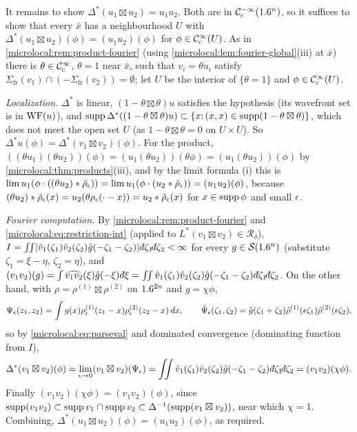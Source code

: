 It remains to show $\Delta^*(u_1\boxtimes u_2)=u_1u_2$. Both are in $\mathcal{C}^{-\infty}_{\mathrm{c}}(1.6^n)$, so it suffices to show
that every $\bar x$ has a neighbourhood $U$ with $\Delta^*(u_1\boxtimes u_2)(\phi)=(u_1u_2)(\phi)$ for
$\phi\in\mathcal{C}^\infty_{\mathrm{c}}(U)$. As in \cref{microlocal:rem:product-fourier} (using
\cref{microlocal:lem:fourier-global}(iii) at $\bar x$) there is $\theta\in\mathcal{C}^\infty_{\mathrm{c}}$, $\theta=1$ near $\bar x$,
such that $v_i=\theta u_i$ satisfy $\Sigma_{\mathrm{fr}}(v_1)\cap(-\Sigma_{\mathrm{fr}}(v_2))=\emptyset$; let $U$ be the
interior of $\{\theta=1\}$ and $\phi\in\mathcal{C}^\infty_{\mathrm{c}}(U)$.

\emph{Localization.} $\Delta^*$ is linear, $(1-\theta\boxtimes\theta)u$ satisfies the hypothesis (its wavefront set is
in $\operatorname{WF}(u)$), and $\operatorname{supp}\Delta^*((1-\theta\boxtimes\theta)u)\subset\{x;(x,x)\in\operatorname{supp}(1-\theta\boxtimes\theta)\}$, which does
not meet the open set $U$ (as $1-\theta\boxtimes\theta=0$ on $U\times U$). So
$\Delta^*u(\phi)=\Delta^*(v_1\boxtimes v_2)(\phi)$. For the product,
$((\theta u_1)(\theta u_2))(\phi)=(u_1(\theta u_2))(\theta\phi)=(u_1(\theta u_2))(\phi)$ by
\cref{microlocal:thm:products}(iii), and by the limit formula (i) this is
$\lim u_1(\phi\cdot((\theta u_2)*\check\rho_\epsilon))=\lim u_1(\phi\cdot(u_2*\check\rho_\epsilon))=(u_1u_2)(\phi)$, because
$(\theta u_2)*\check\rho_\epsilon(x)=u_2(\theta\rho_\epsilon(\cdot-x))=u_2*\check\rho_\epsilon(x)$ for $x\in\operatorname{supp}\phi$ and small $\epsilon$.

\emph{Fourier computation.} By \cref{microlocal:rem:product-fourier} and
\eqref{microlocal:eq:restriction-int} (applied to $L^*(v_1\boxtimes v_2)\in\mathcal R_\delta$),
$I=\iint\abs{\hat v_1(\zeta_1)\hat v_2(\zeta_2)\hat g(-\zeta_1-\zeta_2)}\,\dbar\zeta_1\dbar\zeta_2<\infty$ for every
$g\in\mathcal{S}(1.6^n)$ (substitute $\zeta_1=\xi-\eta$, $\zeta_2=\eta$), and
$(v_1v_2)(g)=\int\widehat{v_1v_2}(\xi)\hat g(-\xi)\,\dbar\xi=\iint\hat v_1(\zeta_1)\hat v_2(\zeta_2)\hat g(-\zeta_1-\zeta_2)
\,\dbar\zeta_1\dbar\zeta_2$. On the other hand, with $\rho=\rho^{(1)}\boxtimes\rho^{(2)}$ on $1.6^{2n}$ and $g=\chi\phi$,
\begin{equation*}
  \Psi_\epsilon(z_1,z_2)=\int g(x)\rho^{(1)}_\epsilon(z_1-x)\rho^{(2)}_\epsilon(z_2-x)\,dx,\qquad
  \hat\Psi_\epsilon(\zeta_1,\zeta_2)=\hat g(\zeta_1+\zeta_2)\hat\rho^{(1)}(\epsilon\zeta_1)\hat\rho^{(2)}(\epsilon\zeta_2),
\end{equation*}
so by \eqref{microlocal:eq:parseval} and dominated convergence (dominating function from $I$),
\begin{equation*}
  \Delta^*(v_1\boxtimes v_2)(\phi)=\lim_{\eps\to0}(v_1\boxtimes v_2)(\Psi_\eps)
  =\iint\hat v_1(\zeta_1)\hat v_2(\zeta_2)\hat g(-\zeta_1-\zeta_2)\,\dbar\zeta_1\dbar\zeta_2=(v_1v_2)(\chi\phi).
\end{equation*}
Finally $(v_1v_2)(\chi\phi)=(v_1v_2)(\phi)$, since $\operatorname{supp}(v_1v_2)\subset\operatorname{supp} v_1\cap\operatorname{supp} v_2\subset
\Delta^{-1}(\operatorname{supp}(v_1\boxtimes v_2))$, near which $\chi=1$. Combining,
$\Delta^*(u_1\boxtimes u_2)(\phi)=(u_1u_2)(\phi)$, as required.

